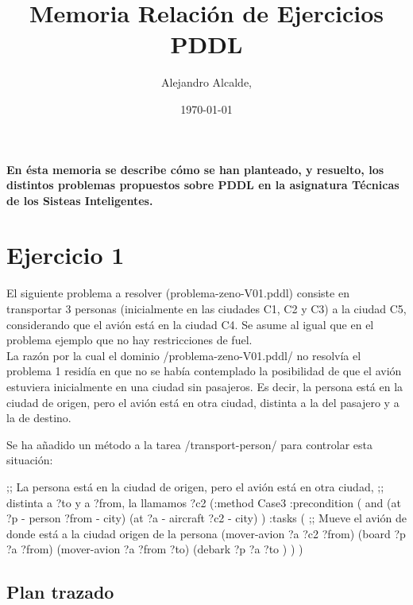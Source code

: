 \documentclass[	DIV=calc,%
							paper=a4,%
							fontsize=11pt]{scrartcl}	 					%
\title{Memoria Relación de Ejercicios PDDL}					%
\author{Alejandro Alcalde, }											%
\date{\usefont{T1}{mdugm}{b}{it}\selectfont\today}																				%
\newcommand{\initial}[1]{%
     \lettrine[lines=3,lhang=0.3,nindent=0em]{
     				\color{DarkGoldenrod}
     				{\textsf{#1}}}{}}
\newcommand{\miit}[1]{{\usefont{T1}{mdugm}{m}{it}\selectfont #1}}
\begin{document}
\maketitle
\thispagestyle{fancy} 			%
\textbf{En ésta memoria se describe cómo se han planteado, y resuelto, los distintos problemas propuestos sobre PDDL en la asignatura Técnicas de los Sisteas Inteligentes.}

\section{Ejercicio 1}

\miit{El siguiente problema a resolver (problema-zeno-V01.pddl) consiste en transportar 3 personas
(inicialmente en las ciudades C1, C2 y C3) a la ciudad C5, considerando que el avión está en la ciudad C4.
Se asume al igual que en el problema ejemplo que no hay restricciones de fuel.}\\

La razón por la cual el dominio \newlispinline/problema-zeno-V01.pddl/ no resolvía el problema 1 residía en que no se había contemplado
la posibilidad de que el avión estuviera inicialmente en una ciudad sin pasajeros. Es decir, la persona está en la ciudad de origen,
pero el avión está en otra ciudad, distinta a la del pasajero y a la de destino.

Se ha añadido un método a la tarea \newlispinline/transport-person/ para controlar esta situación:

\begin{newlispcode}
	;; La persona está en la ciudad de origen, pero el avión está en otra ciudad,
	;; distinta a ?to y a ?from, la llamamos ?c2
	(:method Case3
		:precondition (
			and
				(at ?p - person ?from - city)
				(at ?a - aircraft ?c2 - city)
		)
		:tasks (
				;; Mueve el avión de donde está a la ciudad origen de la persona
				(mover-avion ?a ?c2 ?from)
				(board ?p ?a ?from)
				(mover-avion ?a ?from ?to)
				(debark ?p ?a ?to )
		)
	)
\end{newlispcode}

\subsection{Plan trazado}
\label{sub:Plan trazado}
\end{document}
